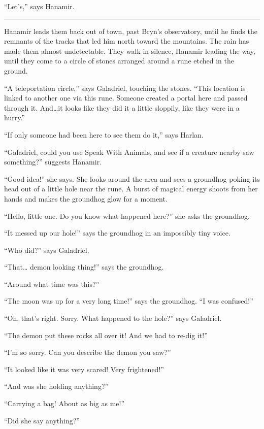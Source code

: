 \documentclass[smalldemyvopaper,11pt,twoside,onecolumn,openright,extrafontsizes]{memoir}
\begin{document}
``Let's,'' says Hanamir.

\begin{center}\rule{0.5\linewidth}{\linethickness}\end{center}

Hanamir leads them back out of town, past Bryn's observatory, until he
finds the remnants of the tracks that led him north toward the
mountains. The rain has made them almost undetectable. They walk in
silence, Hanamir leading the way, until they come to a circle of stones
arranged around a rune etched in the ground.

``A teleportation circle,'' says Galadriel, touching the stones. ``This
location is linked to another one via this rune. Someone created a
portal here and passed through it. And\ldots it looks like they did it a
little sloppily, like they were in a hurry.''

``If only someone had been here to see them do it,'' says Harlan.

``Galadriel, could you use Speak With Animals, and see if a creature
nearby saw something?'' suggests Hanamir.

``Good idea!'' she says. She looks around the area and sees a groundhog
poking its head out of a little hole near the rune. A burst of magical
energy shoots from her hands and makes the groundhog glow for a moment.

``Hello, little one. Do you know what happened here?'' she asks the
groundhog.

``It messed up our hole!'' says the groundhog in an impossibly tiny
voice.

``Who did?'' says Galadriel.

``That\ldots{} demon looking thing!'' says the groundhog.

``Around what time was this?''

``The moon was up for a very long time!'' says the groundhog. ``I was
confused!''

``Oh, that's right. Sorry. What happened to the hole?'' says Galadriel.

``The demon put these rocks all over it! And we had to re-dig it!''

``I'm so sorry. Can you describe the demon you saw?''

``It looked like it was very scared! Very frightened!''

``And was she holding anything?''

``Carrying a bag! About as big as me!''

``Did she say anything?''
\end{document}
